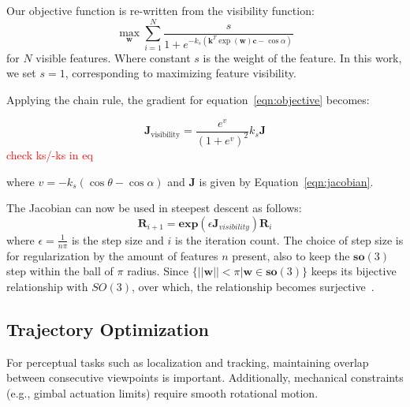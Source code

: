 \documentclass[letterpaper, 10 pt, conference]{ieeeconf}  %
\begin{document}



Our objective function is re-written from the visibility function:
\begin{equation}
\max_{\boldsymbol{w}} \sum_{i=1}^{N}
\frac{s}{1 + e^{-k_s \left( \boldsymbol{k}^T \exp(\boldsymbol{w}) \boldsymbol{c} - \cos\alpha \right)}}
\label{eqn:objective}
\end{equation}
for $N$ visible features. Where constant $s$ is the weight of the feature. In this work, we set $s = 1$, corresponding to maximizing feature visibility.

Applying the chain rule, the gradient for equation~\ref{eqn:objective} becomes:

\begin{equation}
\boldsymbol{J}_{\text{visibility}} =
\frac{e^{v}}{(1+e^{v})^2} k_s \boldsymbol{J}
\end{equation}
\textcolor{red}{check ks/-ks in eq}

where $v = -k_s(\cos\theta - \cos\alpha)$ and $\boldsymbol{J}$ is given by Equation~\ref{eqn:jacobian}.

The Jacobian can now be used in steepest descent as follows:
\begin{equation}
    \boldsymbol{R}_{i+1}=\boldsymbol{exp}(\epsilon \boldsymbol{J}_{visibility})\boldsymbol{R}_{i}
    \label{eq:optimization_loop}
\end{equation}
where $\epsilon=\frac{1}{n\pi}$ is the step size and $i$ is the iteration count. The choice of step size is for regularization by the amount of features $n$ present, also to keep the $\boldsymbol{so}(3)$ step within the ball of $\pi$ radius. Since $\{||\boldsymbol{w}||<\pi|\boldsymbol{w} \in \boldsymbol{so}(3)\}$ keeps its bijective relationship with $SO(3)$, over which, the relationship becomes surjective~\cite{forster2015imu}.


\subsection{Trajectory Optimization}

For perceptual tasks such as localization and tracking, maintaining overlap between consecutive viewpoints is important. Additionally, mechanical constraints (e.g., gimbal actuation limits) require smooth rotational motion.
\end{document}

